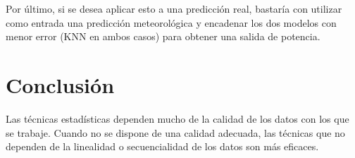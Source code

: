\documentclass[journal]{IEEEtran}
\begin{document}
Por último, si se desea aplicar esto a una predicción real, bastaría con utilizar como entrada una predicción meteorológica y encadenar los dos modelos con menor error (KNN en ambos casos) para obtener una salida de potencia.

\section{Conclusión}
Las técnicas estadísticas dependen mucho de la calidad de los datos con los que se trabaje. Cuando no se dispone de una calidad adecuada, las técnicas que no dependen de la linealidad o secuencialidad de los datos son más eficaces.







%












\ifCLASSOPTIONcaptionsoff
  \newpage
\fi
\end{document}
